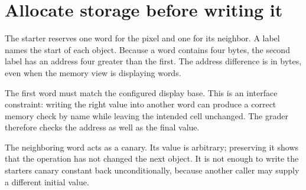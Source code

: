 \section{Allocate storage before writing
  it}\label{002-single-pixel-p02-allocate-storage-before-writing-it}

The starter reserves one word for the pixel and one for its neighbor. A
label names the start of each object. Because a word contains four
bytes, the second label has an address four greater than the first. The
address difference is in bytes, even when the memory view is displaying
words.

The first word must match the configured display base. This is an
interface constraint: writing the right value into another word can
produce a correct memory check by name while leaving the intended cell
unchanged. The grader therefore checks the address as well as the final
value.

The neighboring word acts as a canary. Its value is arbitrary;
preserving it shows that the operation has not changed the next object.
It is not enough to write the starter\textquotesingle s canary constant
back unconditionally, because another caller may supply a different
initial value.
